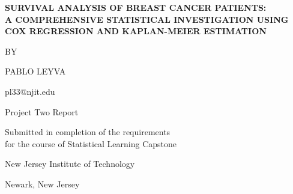 \documentclass[12pt,a4paper]{article}
\begin{document}
\begin{titlepage}
\begin{center}

\vspace*{1.5in}

{\Large \textbf{SURVIVAL ANALYSIS OF BREAST CANCER PATIENTS: \\
A COMPREHENSIVE STATISTICAL INVESTIGATION USING COX REGRESSION AND KAPLAN-MEIER ESTIMATION}}

\vspace{1in}

{\large BY}

\vspace{0.2in}

{\large PABLO LEYVA}

\vspace{0.2in}

{\large pl33@njit.edu}

\vspace{1.2in}

{\large Project Two Report}

\vspace{0.2in}

{\large Submitted in completion of the requirements \\
for the course of Statistical Learning Capstone}

\vspace{1in}

{\large New Jersey Institute of Technology}

\vspace{0.2in}

{\large Newark, New Jersey}

\vspace{0.3in}

\end{center}
\end{titlepage}

\begin{abstract}
This study presents a comprehensive survival analysis of breast cancer patients using the Haberman dataset. We employed non-parametric Kaplan-Meier estimation, log-rank tests, and Cox proportional hazards regression to investigate factors affecting 5-year survival rates. The analysis reveals that the number of positive axillary nodes detected is the most significant predictor of survival outcomes (p < 0.001), with a hazard ratio of 1.048 per additional node. Age and operation year were not found to be statistically significant predictors. The overall 5-year survival rate was 73.5\%, with median survival time exceeding the observation period. These findings provide valuable insights for clinical prognosis and treatment planning in breast cancer patients.
\end{abstract}
\end{document}
